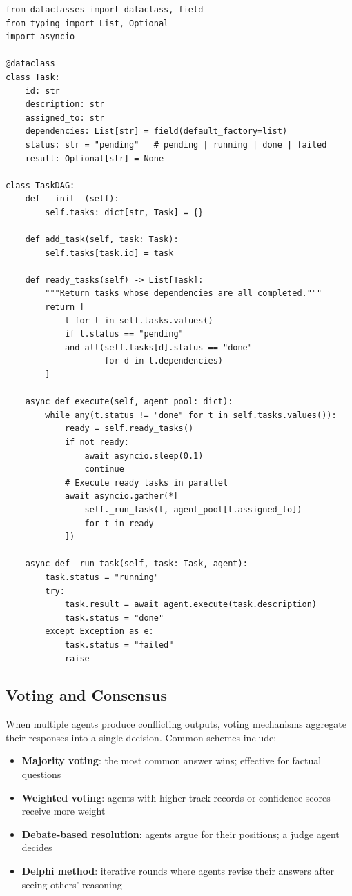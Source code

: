 \begin{lstlisting}[style=pythonstyle, caption={Task DAG decomposition}]
from dataclasses import dataclass, field
from typing import List, Optional
import asyncio

@dataclass
class Task:
    id: str
    description: str
    assigned_to: str
    dependencies: List[str] = field(default_factory=list)
    status: str = "pending"   # pending | running | done | failed
    result: Optional[str] = None

class TaskDAG:
    def __init__(self):
        self.tasks: dict[str, Task] = {}

    def add_task(self, task: Task):
        self.tasks[task.id] = task

    def ready_tasks(self) -> List[Task]:
        """Return tasks whose dependencies are all completed."""
        return [
            t for t in self.tasks.values()
            if t.status == "pending"
            and all(self.tasks[d].status == "done"
                    for d in t.dependencies)
        ]

    async def execute(self, agent_pool: dict):
        while any(t.status != "done" for t in self.tasks.values()):
            ready = self.ready_tasks()
            if not ready:
                await asyncio.sleep(0.1)
                continue
            # Execute ready tasks in parallel
            await asyncio.gather(*[
                self._run_task(t, agent_pool[t.assigned_to])
                for t in ready
            ])

    async def _run_task(self, task: Task, agent):
        task.status = "running"
        try:
            task.result = await agent.execute(task.description)
            task.status = "done"
        except Exception as e:
            task.status = "failed"
            raise
\end{lstlisting}

\subsection{Voting and Consensus}
\label{subsubsec:voting}

When multiple agents produce conflicting outputs, voting mechanisms aggregate their responses into a single decision. Common schemes include:

\begin{itemize}
  \item \textbf{Majority voting}: the most common answer wins; effective for factual questions
  \item \textbf{Weighted voting}: agents with higher track records or confidence scores receive more weight
  \item \textbf{Debate-based resolution}: agents argue for their positions; a judge agent decides
  \item \textbf{Delphi method}: iterative rounds where agents revise their answers after seeing others’ reasoning
\end{itemize}

